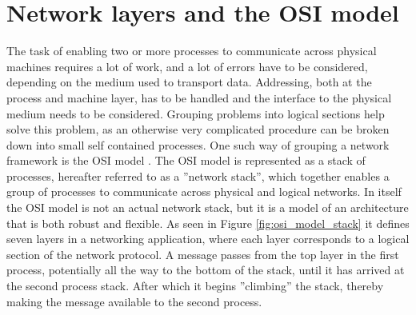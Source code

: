 \section{Network layers and the OSI model}
The task of enabling two or more processes to communicate across physical machines requires a lot of work, and a lot of errors have to be considered, depending on the medium used to transport data. Addressing, both at the process and machine layer, has to be handled and the interface to the physical medium needs to be considered. Grouping problems into logical sections help solve this problem, as an otherwise very complicated procedure can be broken down into small self contained processes.
One such way of grouping a network framework is the OSI model \cite[27-42]{KOM}. The OSI model is represented as a stack of processes, hereafter referred to as a ''network stack'', which together enables a group of processes to communicate across physical and logical networks.
In itself the OSI model is not an actual network stack, but it is a model of an architecture that is both robust and flexible. 
As seen in Figure \ref{fig:osi_model_stack} it defines seven layers in a networking application, where each layer corresponds to a logical section of the network protocol. A message passes from the top layer in the first process, potentially all the way to the bottom of the stack, until it has arrived at the second process stack. After which it begins ''climbing'' the stack, thereby making the message available to the second process.

